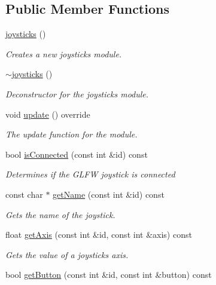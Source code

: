 \subsection*{Public Member Functions}
\begin{DoxyCompactItemize}
\item 
\hyperlink{classflounder_1_1joysticks_ad0676c90afa28b4fb69de64c253e9c34}{joysticks} ()
\begin{DoxyCompactList}\small\item\em Creates a new joysticks module. \end{DoxyCompactList}\item 
\hyperlink{classflounder_1_1joysticks_aaab9cf61c7c5d6736742347c7c657ed8}{$\sim$joysticks} ()
\begin{DoxyCompactList}\small\item\em Deconstructor for the joysticks module. \end{DoxyCompactList}\item 
void \hyperlink{classflounder_1_1joysticks_a346fc03cae7164d6eb927333d1ae725f}{update} () override
\begin{DoxyCompactList}\small\item\em The update function for the module. \end{DoxyCompactList}\item 
bool \hyperlink{classflounder_1_1joysticks_a718814524adfee69d7a700831533c1f6}{is\+Connected} (const int \&id) const
\begin{DoxyCompactList}\small\item\em Determines if the G\+L\+FW joystick is connected \end{DoxyCompactList}\item 
const char $\ast$ \hyperlink{classflounder_1_1joysticks_ab42694655232c0cd832c56f6715b5f68}{get\+Name} (const int \&id) const
\begin{DoxyCompactList}\small\item\em Gets the name of the joystick. \end{DoxyCompactList}\item 
float \hyperlink{classflounder_1_1joysticks_a140f205a6e28354a9d95cff5fbdce318}{get\+Axis} (const int \&id, const int \&axis) const
\begin{DoxyCompactList}\small\item\em Gets the value of a joysticks axis. \end{DoxyCompactList}\item 
bool \hyperlink{classflounder_1_1joysticks_afc3effcb87566223f35bdb3130c8e4fa}{get\+Button} (const int \&id, const int \&button) const

\end{DoxyCompactItemize}
